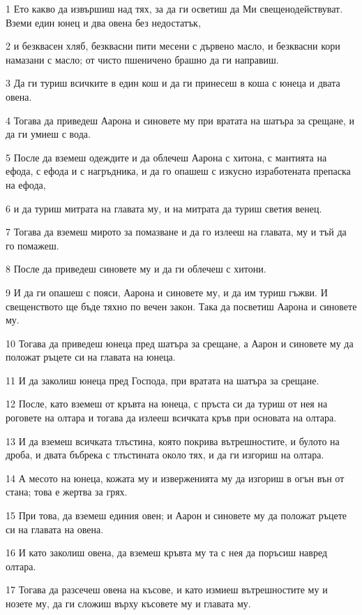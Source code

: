\par 1 Ето какво да извършиш над тях, за да ги осветиш да Ми свещенодействуват. Вземи един юнец и два овена без недостатък,
\par 2 и безквасен хляб, безквасни пити месени с дървено масло, и безквасни кори намазани с масло; от чисто пшеничено брашно да ги направиш.
\par 3 Да ги туриш всичките в един кош и да ги принесеш в коша с юнеца и двата овена.
\par 4 Тогава да приведеш Аарона и синовете му при вратата на шатъра за срещане, и да ги умиеш с вода.
\par 5 После да вземеш одеждите и да облечеш Аарона с хитона, с мантията на ефода, с ефода и с нагръдника, и да го опашеш с изкусно изработената препаска на ефода,
\par 6 и да туриш митрата на главата му, и на митрата да туриш светия венец.
\par 7 Тогава да вземеш мирото за помазване и да го излееш на главата, му и тъй да го помажеш.
\par 8 После да приведеш синовете му и да ги облечеш с хитони.
\par 9 И да ги опашеш с пояси, Аарона и синовете му, и да им туриш гъжви. И свещенството ще бъде тяхно по вечен закон. Така да посветиш Аарона и синовете му.
\par 10 Тогава да приведеш юнеца пред шатъра за срещане, а Аарон и синовете му да положат ръцете си на главата на юнеца.
\par 11 И да заколиш юнеца пред Господа, при вратата на шатъра за срещане.
\par 12 После, като вземеш от кръвта на юнеца, с пръста си да туриш от нея на роговете на олтара и тогава да излееш всичката кръв при основата на олтара.
\par 13 И да вземеш всичката тлъстина, която покрива вътрешностите, и булото на дроба, и двата бъбрека с тлъстината около тях, и да ги изгориш на олтара.
\par 14 А месото на юнеца, кожата му и изверженията му да изгориш в огън вън от стана; това е жертва за грях.
\par 15 При това, да вземеш единия овен; и Аарон и синовете му да положат ръцете си на главата на овена.
\par 16 И като заколиш овена, да вземеш кръвта му та с нея да поръсиш навред олтара.
\par 17 Тогава да разсечеш овена на късове, и като измиеш вътрешностите му и нозете му, да ги сложиш върху късовете му и главата му.
